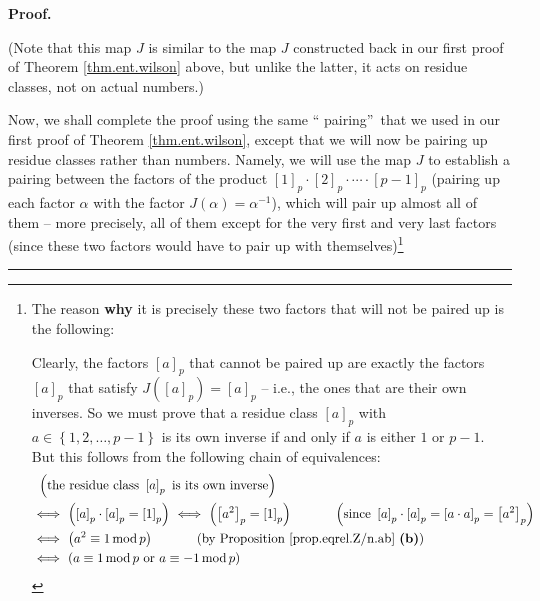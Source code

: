 \documentclass[numbers=enddot,12pt,final,onecolumn,notitlepage]{scrartcl}%
\numberwithin{exer}{subsection}
\theoremstyle{definition}
\newenvironment{fineprint}{\begin{small}}{\end{small}}
\newenvironment{proof}[1][Proof]{\noindent\textbf{#1.} }{\ \rule{0.5em}{0.5em}}
\begin{document}
\begin{proof}
\begin{fineprint}
(Note that this map $J$ is similar to the map $J$ constructed back in our
first proof of Theorem \ref{thm.ent.wilson} above, but unlike the latter, it
acts on residue classes, not on actual numbers.)
\end{fineprint}

Now, we shall complete the proof using the same \textquotedblleft
pairing\textquotedblright\ that we used in our first proof of Theorem
\ref{thm.ent.wilson}, except that we will now be pairing up residue classes
rather than numbers. Namely, we will use the map $J$ to establish a pairing
between the factors of the product $\left[  1\right]  _{p}\cdot\left[
2\right]  _{p}\cdot\cdots\cdot\left[  p-1\right]  _{p}$ (pairing up each
factor $\alpha$ with the factor $J\left(  \alpha\right)  =\alpha^{-1}$), which
will pair up almost all of them -- more precisely, all of them except for the
very first and very last factors (since these two factors would have to pair
up with themselves)\footnote{The reason \textbf{why} it is precisely these two
factors that will not be paired up is the following:
\par
Clearly, the factors $\left[  a\right]  _{p}$ that cannot be paired up are
exactly the factors $\left[  a\right]  _{p}$ that satisfy $J\left(  \left[
a\right]  _{p}\right)  =\left[  a\right]  _{p}$ -- i.e., the ones that are
their own inverses. So we must prove that a residue class $\left[  a\right]
_{p}$ with $a\in\left\{  1,2,\ldots,p-1\right\}  $ is its own inverse if and
only if $a$ is either $1$ or $p-1$. But this follows from the following chain
of equivalences:%
\begin{align*}
&  \ \left(  \text{the residue class }\left[  a\right]  _{p}\text{ is its own
inverse}\right) \\
&  \Longleftrightarrow\ \left(  \left[  a\right]  _{p}\cdot\left[  a\right]
_{p}=\left[  1\right]  _{p}\right)  \ \Longleftrightarrow\ \left(  \left[
a^{2}\right]  _{p}=\left[  1\right]  _{p}\right)  \ \ \ \ \ \ \ \ \ \ \left(
\text{since }\left[  a\right]  _{p}\cdot\left[  a\right]  _{p}=\left[  a\cdot
a\right]  _{p}=\left[  a^{2}\right]  _{p}\right) \\
&  \Longleftrightarrow\ \left(  a^{2}\equiv1\operatorname{mod}p\right)
\ \ \ \ \ \ \ \ \ \ \left(  \text{by Proposition \ref{prop.eqrel.Z/n.ab}
\textbf{(b)}}\right) \\
&  \Longleftrightarrow\ \left(  a\equiv1\operatorname{mod}p\text{ or }%
a\equiv-1\operatorname{mod}p\right) \\

\end{align*}}
\end{proof}
\end{document}
